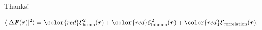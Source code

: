 \documentclass{beamer}
\newcommand{\redc}[1]{{\color{red} #1}}
\newcommand{\bluec}[1]{{\color{blue} #1}}
\renewcommand{\v}[1]{\textbf{\textit{#1}}}
\begin{document}
\begin{frame}
  \vfill
  \centerline{ \Huge
    Thanks!  }
  \vfill
  \bluec{
    \begin{align*} \nonumber
      \langle\vert\Delta\v F(\v r)\vert^2\rangle
      = 
      \redc{\mathcal E^2_{\textrm{homo}}(\v r)} +
      \redc{\mathcal E^2_{\textrm{inhomo}}(\v r)} +
      \redc{\mathcal E_{\textrm{correlation}}(\v r)}.
    \end{align*}
  }
\end{frame}
\end{document}
